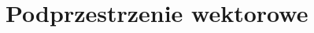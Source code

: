 \documentclass[a5paper,8pt]{article}
\newtheorem{example}{Przykład}[section]
\newtheorem{lemat}{Lemat}[section]
\newtheorem{definition}{Definicja}[section]
\newtheorem{theorem}{Twierdzenie}[section]
\begin{document}















    \section{Podprzestrzenie wektorowe} %
    \label{sec:podprzestrzenie_wektorowe}








\end{document}
